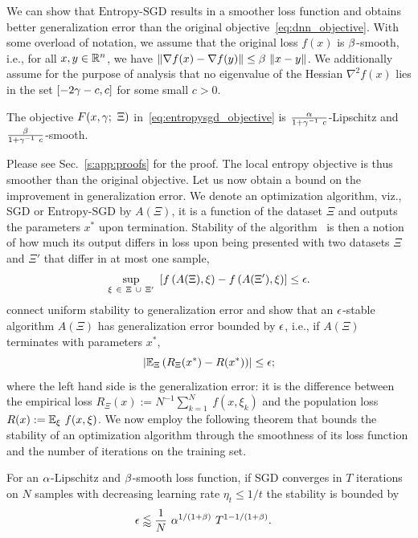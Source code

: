 \documentclass[10pt]{article}
\newcommand{\entropysgd}{\mathrm{Entropy}\textrm{-}\mathrm{SGD}}
\begin{document}
We can show that $\entropysgd$ results in a smoother loss function and obtains better generalization error than the original objective~\eqref{eq:dnn_objective}. With some overload of notation, we assume that the original loss $f(x)$ is $\beta$-smooth, i.e., for all $x,y \in \mathbb{R}^n$, we have $\lVert\nabla f(x) - \nabla f(y)\rVert \leq \beta\ \lVert x-y\rVert$. We additionally assume for the purpose of analysis that no eigenvalue of the Hessian $\nabla^2 f(x)$ lies in the set $[-2 \gamma-c, c]$ for some small $c > 0$.
%
\begin{lemma}
\label{lem:smoothness_reduction}
The objective $F(x, \gamma;\ \Xi)$ in~\eqref{eq:entropysgd_objective} is $\frac{\alpha}{1 + \gamma^{-1}\ c}$-Lipschitz and $\frac{\beta}{1 + \gamma^{-1}\ c}$-smooth.
\end{lemma}
Please see Sec.~\ref{s:app:proofs} for the proof. The local entropy objective is thus smoother than the original objective.
%
Let us now obtain a bound on the improvement in generalization error. We denote an optimization algorithm, viz., SGD or $\entropysgd$ by $A(\Xi)$, it is a function of the dataset $\Xi$ and outputs the parameters $x^*$ upon termination. Stability of the algorithm~\citep{bousquet2002stability} is then a notion of how much its output differs in loss upon being presented with two datasets $\Xi$ and $\Xi'$ that differ in at most one sample,
$$
    \sup_{\xi\ \in\ \Xi\ \cup\ \Xi'}\ \left[ f \left(A(\Xi), \xi\right) - f \left(A(\Xi'), \xi\right)\right] \leq \epsilon.
$$
\citet{hardt2015train} connect uniform stability to generalization error and show that an $\epsilon$-stable algorithm $A(\Xi)$ has generalization error bounded by $\epsilon$, i.e., if $A(\Xi)$ terminates with parameters $x^*$,
$$
    \left|  \mathbb{E}_{\Xi} \left(R_\Xi(x^*) - R(x^*)\right)  \right| \leq \epsilon;
$$
where the left hand side is the generalization error: it is the difference between the empirical loss $R_\Xi(x) := N^{-1} \sum_{k=1}^N\ f(x, \xi_k)$ and the population loss $R(x) := \mathbb{E}_{\xi}\ f(x, \xi)$.
%
We now employ the following theorem that bounds the stability of an optimization algorithm through the smoothness of its loss function and the number of iterations on the training set.
\begin{theorem}
\label{thm:generalization_bound_nonconvex}
For an $\alpha$-Lipschitz and $\beta$-smooth loss function, if SGD converges in $T$ iterations on $N$ samples with decreasing learning rate $\eta_t \leq 1/t$ the stability is bounded by
\begin{align*}
    \epsilon
    &\lessapprox \frac{1}{N}\ \alpha^{1/(1 + \beta)}\ T^{1 - 1/(1 + \beta)}.
\end{align*}
\end{theorem}
\end{document}
